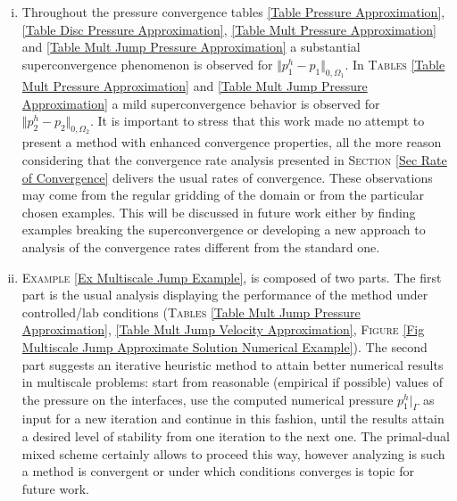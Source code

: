 \documentclass[3p]{elsarticle}
\def\pone{p_{1}}
\def\poneh{p_{1}^{h}}
\def\ptwo{p_{2}}
\def\ptwoh{p_{2}^{h}}
\begin{document}
\begin{enumerate}[(i)]
\item Throughout the pressure convergence tables \ref{Table Pressure Approximation}, \ref{Table Disc Pressure Approximation}, \ref{Table Mult Pressure Approximation} and \ref{Table Mult Jump Pressure Approximation} a substantial superconvergence phenomenon is observed for $ \Vert \poneh - \pone\Vert_{0, \Omega_{1}} $. In \textsc{Tables}  \ref{Table Mult Pressure Approximation} and \ref{Table Mult Jump Pressure Approximation} a mild superconvergence behavior is observed for $ \Vert \ptwoh - \ptwo \Vert_{0, \Omega_{2}} $. It is important to stress that this work made no attempt to present a method with enhanced convergence properties, all the more reason considering that the convergence rate analysis presented in \textsc{Section} \ref{Sec Rate of Convergence} delivers the usual rates of convergence. These observations may come from the regular gridding of the domain or from the particular chosen examples. This will be discussed in future work either by finding examples breaking the superconvergence or developing a new approach to analysis of the convergence rates different from the standard one. 

\item \textsc{Example} \ref{Ex Multiscale Jump Example}, is composed of two parts. The first part is the usual analysis displaying the performance of the method under controlled/lab conditions (\textsc{Tables} \ref{Table Mult Jump Pressure Approximation}, \ref{Table Mult Jump Velocity Approximation}, \textsc{Figure} \ref{Fig Multiscale Jump Approximate Solution Numerical Example}). The second part suggests an iterative heuristic method to attain better numerical results in multiscale problems: start from reasonable (empirical if possible) values of the pressure on the interfaces, use the computed numerical pressure $ \poneh\big\vert_{\Gamma} $ as input for a new iteration and continue in this fashion, until the results attain a desired level of stability from one iteration to the next one. The primal-dual mixed scheme certainly allows to proceed this way, however analyzing is such a method is convergent or under which conditions converges is topic for future work.


\end{enumerate}
\end{document}
